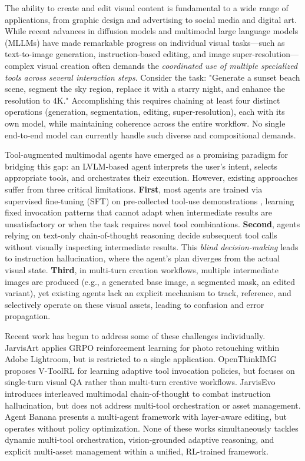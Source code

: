 \documentclass{article}
\begin{document}
The ability to create and edit visual content is fundamental to a wide range of applications, from graphic design and advertising to social media and digital art. While recent advances in diffusion models and multimodal large language models (MLLMs) have made remarkable progress on individual visual tasks—such as text-to-image generation, instruction-based editing, and image super-resolution—complex visual creation often demands the \textit{coordinated use of multiple specialized tools across several interaction steps}. Consider the task: "Generate a sunset beach scene, segment the sky region, replace it with a starry night, and enhance the resolution to 4K." Accomplishing this requires chaining at least four distinct operations (generation, segmentation, editing, super-resolution), each with its own model, while maintaining coherence across the entire workflow. No single end-to-end model can currently handle such diverse and compositional demands.

Tool-augmented multimodal agents \cite{shen2023hugginggpt, wu2023visualchatgpt, zhu2024genartist} have emerged as a promising paradigm for bridging this gap: an LVLM-based agent interprets the user's intent, selects appropriate tools, and orchestrates their execution. However, existing approaches suffer from three critical limitations. \textbf{First}, most agents are trained via supervised fine-tuning (SFT) on pre-collected tool-use demonstrations \cite{liu2024llavaplus, qi2024cogcom, wang2024mllmtool}, learning fixed invocation patterns that cannot adapt when intermediate results are unsatisfactory or when the task requires novel tool combinations. \textbf{Second}, agents relying on text-only chain-of-thought reasoning \cite{yao2022react} decide subsequent tool calls without visually inspecting intermediate results. This \textit{blind decision-making} leads to instruction hallucination, where the agent's plan diverges from the actual visual state. \textbf{Third}, in multi-turn creation workflows, multiple intermediate images are produced (e.g., a generated base image, a segmented mask, an edited variant), yet existing agents lack an explicit mechanism to track, reference, and selectively operate on these visual assets, leading to confusion and error propagation.

Recent work has begun to address some of these challenges individually. JarvisArt \cite{lin2025jarvisart} applies GRPO reinforcement learning for photo retouching within Adobe Lightroom, but is restricted to a single application. OpenThinkIMG \cite{su2025openthinkimg} proposes V-ToolRL for learning adaptive tool invocation policies, but focuses on single-turn visual QA rather than multi-turn creative workflows. JarvisEvo \cite{lin2025jarvisevo} introduces interleaved multimodal chain-of-thought to combat instruction hallucination, but does not address multi-tool orchestration or asset management. Agent Banana \cite{ye2026agentbanana} presents a multi-agent framework with layer-aware editing, but operates without policy optimization. None of these works simultaneously tackles dynamic multi-tool orchestration, vision-grounded adaptive reasoning, and explicit multi-asset management within a unified, RL-trained framework.
\end{document}
